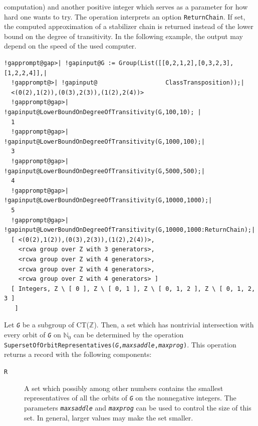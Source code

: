 \documentclass[a4paper,11pt]{report}
\begin{document}
{{computation) and another positive integer which serves as a parameter for how
hard one wants to try. The operation interprets an option \texttt{ReturnChain}. If set, the computed approximation of a stabilizer chain is returned instead
of the lower bound on the degree of transitivity. In the following example,
the output may depend on the speed of the used computer. 
\begin{Verbatim}[commandchars=!@|,fontsize=\small,frame=single,label=Example]
  !gapprompt@gap>| !gapinput@G := Group(List([[0,2,1,2],[0,3,2,3],[1,2,2,4]],|
  !gapprompt@>| !gapinput@                   ClassTransposition));|
  <(0(2),1(2)),(0(3),2(3)),(1(2),2(4))>
  !gapprompt@gap>| !gapinput@LowerBoundOnDegreeOfTransitivity(G,100,10); |
  1
  !gapprompt@gap>| !gapinput@LowerBoundOnDegreeOfTransitivity(G,1000,100);|
  3
  !gapprompt@gap>| !gapinput@LowerBoundOnDegreeOfTransitivity(G,5000,500);|
  4
  !gapprompt@gap>| !gapinput@LowerBoundOnDegreeOfTransitivity(G,10000,1000);|
  5
  !gapprompt@gap>| !gapinput@LowerBoundOnDegreeOfTransitivity(G,10000,1000:ReturnChain);|
  [ <(0(2),1(2)),(0(3),2(3)),(1(2),2(4))>, 
    <rcwa group over Z with 3 generators>, 
    <rcwa group over Z with 4 generators>, 
    <rcwa group over Z with 4 generators>, 
    <rcwa group over Z with 4 generators> ]
  [ Integers, Z \ [ 0 ], Z \ [ 0, 1 ], Z \ [ 0, 1, 2 ], Z \ [ 0, 1, 2, 3 ] 
   ]
\end{Verbatim}
  Let \mbox{\texttt{\mdseries\slshape G}} be a subgroup of CT({\ensuremath{\mathbb Z}}). Then, a set which has
nontrivial intersection with every orbit of \mbox{\texttt{\mdseries\slshape G}} on ${\ensuremath{\mathbb N}}_0$ can be determined by the operation \texttt{SupersetOfOrbitRepresentatives(\mbox{\texttt{\mdseries\slshape G}},\mbox{\texttt{\mdseries\slshape maxsaddle}},\mbox{\texttt{\mdseries\slshape maxprog}})}. This operation returns a record with the following components: 
\begin{description}
\item[{\texttt{R}}]  A set which \texttt{}\texttt{} possibly among other
numbers \texttt{}\texttt{} contains the smallest
representatives of all the orbits of \mbox{\texttt{\mdseries\slshape G}} on the nonnegative integers. The parameters \mbox{\texttt{\mdseries\slshape maxsaddle}} and \mbox{\texttt{\mdseries\slshape maxprog}} can be used to control the size of this set. In general, larger values may
make the set smaller. 

\end{description}}}
\end{document}
